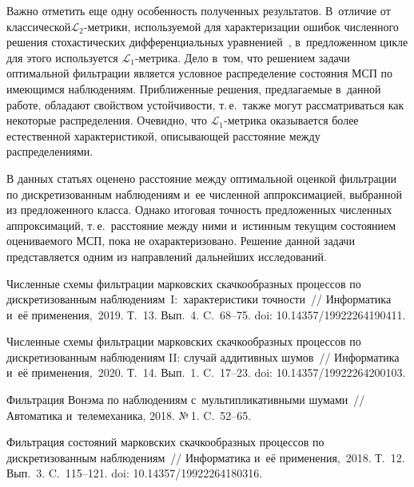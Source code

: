\begin{multicols}{2}
 Важно отметить еще одну особенность полученных результатов. В~отличие от 
классической\linebreak $\mathcal{L}_2$-мет\-ри\-ки, используемой для характеризации 
ошибок численного решения стохастических дифференциальных 
уравненией~\cite{KP_92}, в~предложенном цик\-ле для этого используется 
$\mathcal{L}_1$-метрика. Дело в~том, что решением задачи оптимальной 
фильт\-ра\-ции является условное распределение со\-сто\-яния МСП по имеющимся 
наблюдениям. Приближенные решения, предлагаемые в~данной работе, обладают 
свойством устойчивости, т.\,е.\ также могут рас\-смат\-ри\-вать\-ся как некоторые 
распределения. Очевидно, что $\mathcal{L}_1$-метрика оказывается более 
естественной характеристикой, описывающей расстояние между 
распределениями.

В данных статьях оценено расстояние между оптимальной оценкой фильтрации 
по дискретизованным наблюдениям и~ее численной аппроксимацией, выбранной 
из предложенного класса. Однако итоговая точность предложенных численных 
аппроксимаций, т.\,е.\ расстояние между ними и~истинным текущим 
состоянием оцениваемого МСП, пока не охарактеризовано. Решение данной 
задачи представляется одним из направлений дальнейших исследований.


{\small\frenchspacing
 {%
 \begin{thebibliography}{9}

  Численные схемы фильтрации марковских скачкообразных 
процессов по дискретизованным наблюдениям~I:~характеристики точности~// 
Информатика и~её применения,~2019. Т.~13. Вып.~4. C.~68--75. doi: 
10.14357/19922264190411.

  Численные схемы фильтрации марковских скачкообразных 
процессов по дискретизованным наблюдениям II: случай аддитивных шумов~// 
Информатика и~её применения,~2020. Т.~14. Вып.~1. C.~17--23. 
doi:  10.14357/19922264200103.

 Фильтрация Вонэма по наблюдениям с~мультипликативными 
шумами~// Автоматика и~телемеханика, 2018.
№\,1. C.~52--65. %

  Фильтрация состояний марковских скачкообразных процессов 
по дискретизованным наблюдениям~// Информатика и~её применения,~2018. 
Т.~12. Вып.~3. C.~115--121. doi: 10.14357/19922264180316.



\end{thebibliography}}}
\end{multicols}
